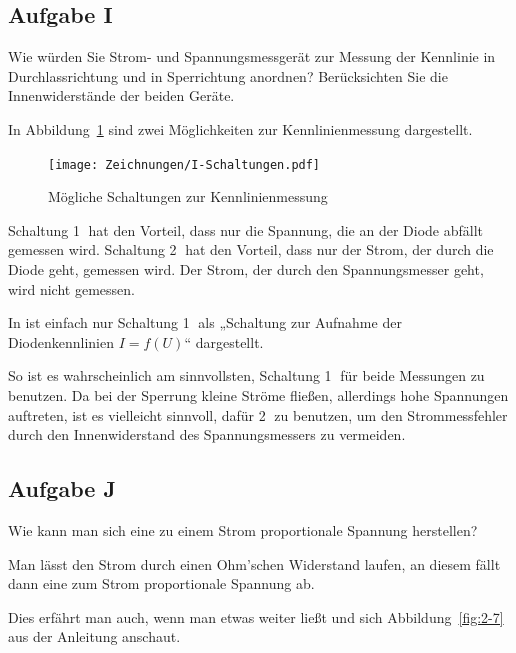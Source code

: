 \FloatBarrier
\subsection{Aufgabe I}
\label{s:I}

\begin{problem}
	Wie würden Sie Strom- und Spannungsmessgerät zur Messung der Kennlinie in
	Durchlassrichtung und in Sperrichtung anordnen? Berücksichten Sie die
	Innenwiderstände der beiden Geräte.
\end{problem}

In Abbildung~\ref{fig:I-Schaltungen} sind zwei Möglichkeiten zur
Kennlinienmessung dargestellt.

\begin{figure}[htbp]
	\centering
	\texttt{[image: Zeichnungen/I-Schaltungen.pdf]}
	\caption{%
		Mögliche Schaltungen zur Kennlinienmessung
	}
	\label{fig:I-Schaltungen}
\end{figure}

Schaltung \textcircled 1 hat den Vorteil, dass nur die Spannung, die an der
Diode abfällt gemessen wird. Schaltung \textcircled 2 hat den Vorteil, dass nur
der Strom, der durch die Diode geht, gemessen wird. Der Strom, der durch den
Spannungsmesser geht, wird nicht gemessen.

In \cite[Bild 14.2]{beuth/elementare_elektronik} ist einfach nur Schaltung
\textcircled 1 als „Schaltung zur Aufnahme der Diodenkennlinien $I = f(U)$“
dargestellt.

So ist es wahrscheinlich am sinnvollsten, Schaltung \textcircled 1 für beide
Messungen zu benutzen. Da bei der Sperrung kleine Ströme fließen, allerdings
hohe Spannungen auftreten, ist es vielleicht sinnvoll, dafür \textcircled 2 zu
benutzen, um den Strommessfehler durch den Innenwiderstand des Spannungsmessers
zu vermeiden.

\FloatBarrier
\subsection{Aufgabe J}

\begin{problem}
	Wie kann man sich eine zu einem Strom proportionale Spannung herstellen?
\end{problem}

Man lässt den Strom durch einen Ohm'schen Widerstand laufen, an diesem fällt
dann eine zum Strom proportionale Spannung ab.

Dies erfährt man auch, wenn man etwas weiter ließt und sich
Abbildung~\ref{fig:2-7} aus der Anleitung anschaut.

